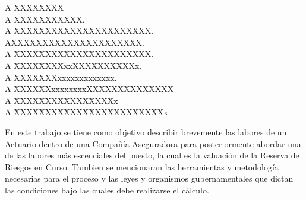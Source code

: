 \documentclass[11pt,twoside,openright,spanish]{report}
\numberwithin{equation}{chapter}
\numberwithin{figure}{chapter}
\numberwithin{table}{chapter}
\begin{document}
	\newpage
	$\ $
	\thispagestyle{empty} %
	
	\begin{acknowledgements}
	 
	A XXXXXXXX
	\\

	A XXXXXXXXXXX.
	\\
	
	A XXXXXXXXXXXXXXXXXXXXXX.
	\\
	
	AXXXXXXXXXXXXXXXXXXXXX.
	\\
	
	A XXXXXXXXXXXXXXXXXXXXXX.
	\\
	
	A XXXXXXXXxxXXXXXXXXXXx.
	\\
	
	A XXXXXXXxxxxxxxxxxxxx.   
	\\
	
	A XXXXXXxxxxxxxxXXXXXXXXXXXXXX
	\\
	
	A XXXXXXXXXXXXXXXXx
	\\
	
	A XXXXXXXXXXXXXXXXXXXXXXXXx
	\\
	
		
	\end{acknowledgements}
	
	
	\tableofcontents
	
	
	\addtolength{\headheight}{\baselineskip}
	\pagestyle{fancy}
	\cleardoublepage
		
	\begin{preface}
	\doublespacing
	
	En este trabajo se tiene como objetivo describir brevemente las labores de un Actuario dentro de una Compañía Aseguradora para posteriormente abordar una de las labores más escenciales del puesto, la cual es la valuación de la Reserva de Riesgos en Curso. Tambien se mencionaran las herramientas y metodología necesarias para el proceso y las leyes y organismos gubernamentales que dictan las condiciones bajo las cuales debe realizarse el cálculo.
		
	\end{preface}
	
\end{document}
